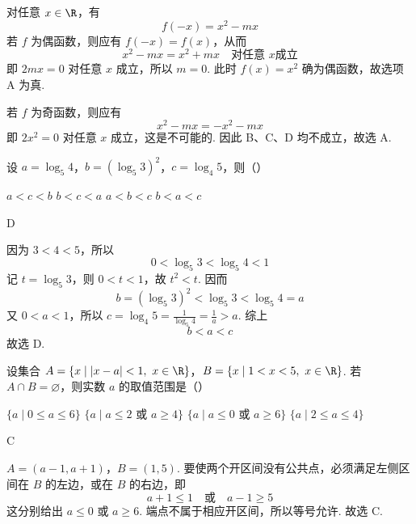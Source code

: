 \begin{solution}
对任意 \(x\in\R\)，有
\[
f(-x)=x^2-mx
\]
若 \(f\) 为偶函数，则应有 \(f(-x)=f(x)\)，从而
\[
x^2-mx=x^2+mx\quad\text{对任意 }x\text{成立}
\]
即 \(2mx=0\) 对任意 \(x\) 成立，所以 \(m=0\). 此时 \(f(x)=x^2\) 确为偶函数，故选项 A 为真.

若 \(f\) 为奇函数，则应有
\[
x^2-mx=-x^2-mx
\]
即 \(2x^2=0\) 对任意 \(x\) 成立，这是不可能的. 因此 B、C、D 均不成立，故选 A.
\end{solution}

\begin{problem}
设 \(a = \log_{5} 4\)，\(b = (\log_{5} 3)^{2}\)，\(c = \log_{4} 5\)，则（\quad）

\choices
    {\(a < c < b\)}
    {\(b < c < a\)}
    {\(a < b < c\)}
    {\(b < a < c\)}
\end{problem}

\begin{answer}
D
\end{answer}

\begin{solution}
因为 \(3<4<5\)，所以
\[
0<\log_5 3<\log_5 4<1
\]
记 \(t=\log_5 3\)，则 \(0<t<1\)，故 \(t^2<t\). 因而
\[
b=(\log_5 3)^2<\log_5 3<\log_5 4=a
\]
又 \(0<a<1\)，所以 \(c=\log_4 5=\frac{1}{\log_5 4}=\frac{1}{a}>a\). 综上
\[
b<a<c
\]
故选 D.
\end{solution}

\begin{problem}
设集合 \(A = \{x \mid |x - a| < 1,\ x \in \R\}\)，\(B = \{x \mid 1 < x < 5,\ x \in \R\}\). 若 \(A \cap B = \varnothing\)，则实数 \(a\) 的取值范围是（\quad）

\choices
    {\(\{a \mid 0 \leqslant a \leqslant 6\}\)}
    {\(\{a \mid a \leqslant 2\text{ 或 }a \geqslant 4\}\)}
    {\(\{a \mid a \leqslant 0\text{ 或 }a \geqslant 6\}\)}
    {\(\{a \mid 2 \leqslant a \leqslant 4\}\)}
\end{problem}

\begin{answer}
C
\end{answer}

\begin{solution}
\(A=(a-1,a+1)\)，\(B=(1,5)\).
要使两个开区间没有公共点，必须满足左侧区间在 \(B\) 的左边，或在 \(B\) 的右边，即
\[
a+1\leqslant 1\quad\text{或}\quad a-1\geqslant 5
\]
这分别给出 \(a\leqslant0\) 或 \(a\geqslant6\). 端点不属于相应开区间，所以等号允许. 故选 C.
\end{solution}

